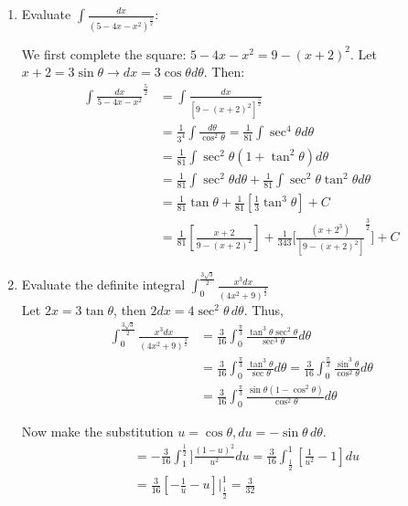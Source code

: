 \documentclass[11pt]{article}
\theoremstyle{plain}
\theoremstyle{remark}
\theoremstyle{plain}
\begin{document}
\begin{tcolorbox}[colback=magenta!5!white,colframe=magenta!75!black,title=Example ]
    \begin{enumerate} 
        \item Evaluate $\int\frac{dx}{(5-4x-x^2)^{\frac{5}{2}}}$:
        
        We first complete the square: $5-4x-x^2=9-(x+2)^2$. Let $x+2=3\sin\theta\rightarrow dx=3\cos\theta d\theta$. Then:
        \begin{align*}
            \int\frac{dx}{5-4x-x^2}^{\frac{5}{2}}&=\int\frac{dx}{[9-(x+2)^2]^{\frac{5}{2}}}\\
            &=\frac{1}{3^4}\int\frac{d\theta}{\cos^2\theta}=\frac{1}{81}\int\sec^4\theta d\theta\\
            &=\frac{1}{81}\int\sec^2\theta(1+\tan^2\theta)d\theta \\
            &=\frac{1}{81}\int\sec^2\theta d\theta +\frac{1}{81}\int\sec^2\theta \tan^2\theta d\theta\\
            &=\frac{1}{81}\tan\theta+\frac{1}{81}[\frac{1}{3}\tan^3\theta]+C\\
            &=\frac{1}{81}[\frac{x+2}{9-(x+2)^2}]+\frac{1}{343}\Big[\frac{(x+2^3)}{[9-(x+2)^2]}^{\frac{3}{2}}\Big]+C
        \end{align*}

        \item Evaluate the definite integral $\int_0^{\frac{3\sqrt{3}}{2}}\frac{x^3dx}{(4x^2+9)^{\frac{3}{2}}}$\\
        
        Let $2x=3\tan\theta$, then $2dx=4\sec^2\theta\,d\theta$. Thus,
        \begin{align*}
            \int_0^{\frac{3\sqrt{3}}{2}}\frac{x^3dx}{(4x^2+9)^{\frac{3}{2}}}&=\frac{3}{16}\int_0^{\frac{\pi}{3}}\frac{\tan^3\theta\sec^2\theta}{\sec^3\theta}d\theta\\
            &=\frac{3}{16}\int_0^{\frac{\pi}{3}}\frac{\tan^3\theta}{\sec\theta}d\theta =\frac{3}{16}\int_0^{\frac{\pi}{3}}\frac{\sin^3\theta}{\cos^2\theta}d\theta\\
            &=\frac{3}{16}\int_0^{\frac{\pi}{3}}\frac{\sin\theta(1-\cos^2\theta)}{\cos^2\theta}d\theta 
        \end{align*}

        Now make the substitution $u=\cos\theta, du=-\sin\theta\,d\theta$.
        \begin{align*}
            &=-\frac{3}{16}\int_1^{\frac{1}{2}}]\frac{(1-u)^2}{u^2}du=\frac{3}{16}\int_{\frac{1}{2}}^1[\frac{1}{u^2}-1]du\\
            &=\frac{3}{16}[-\frac{1}{u}-u]\Big|_{\frac{1}{2}}^1=\frac{3}{32}
        \end{align*}
    \end{enumerate}
\end{tcolorbox}   
\end{document}
